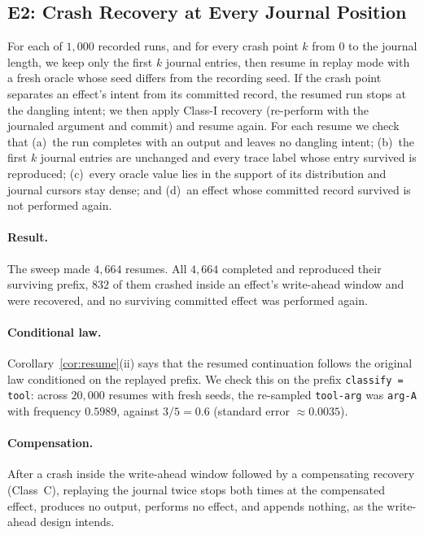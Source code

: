 \subsection{E2: Crash Recovery at Every Journal Position}
\label{sec:eval-e2}

For each of $1{,}000$ recorded runs, and for every crash point $k$ from $0$ to the journal
length, we keep only the first $k$ journal entries, then resume in replay mode with a fresh
oracle whose seed differs from the recording seed.
If the crash point separates an effect's intent from its committed record, the resumed run
stops at the dangling intent; we then apply Class-I recovery (re-perform with the journaled
argument and commit) and resume again.
For each resume we check that
(a)~the run completes with an output and leaves no dangling intent;
(b)~the first $k$ journal entries are unchanged and every trace label whose entry survived is
reproduced;
(c)~every oracle value lies in the support of its distribution and journal cursors stay dense;
and (d)~an effect whose committed record survived is not performed again.

\paragraph{Result.}
The sweep made $4{,}664$ resumes.
All $4{,}664$ completed and reproduced their surviving prefix, $832$ of them crashed inside an
effect's write-ahead window and were recovered, and no surviving committed effect was performed
again.

\paragraph{Conditional law.}
Corollary~\ref{cor:resume}(ii) says that the resumed continuation follows the original law conditioned on the
replayed prefix.
We check this on the prefix \texttt{classify = tool}: across $20{,}000$ resumes with fresh seeds,
the re-sampled \texttt{tool-arg} was \texttt{arg-A} with frequency $0.5989$, against
$3/5 = 0.6$ (standard error $\approx 0.0035$).

\paragraph{Compensation.}
After a crash inside the write-ahead window followed by a compensating recovery (Class~C),
replaying the journal twice stops both times at the compensated effect, produces no output,
performs no effect, and appends nothing, as the write-ahead design intends.

